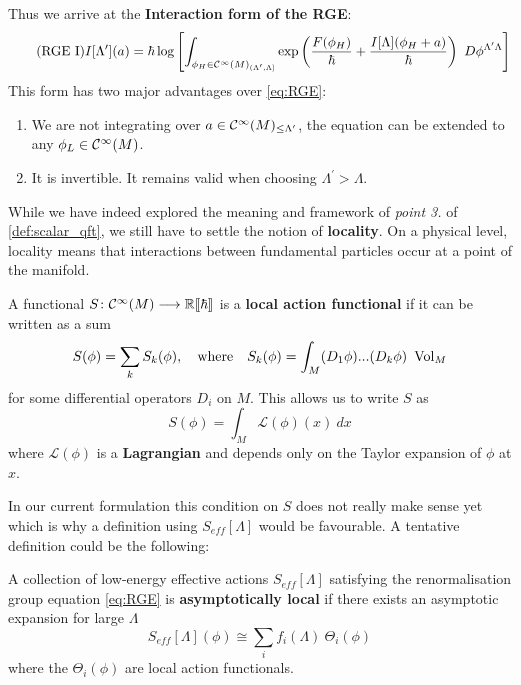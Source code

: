 Thus we arrive at the \textbf{Interaction form of the RGE}:
\begin{align}
\label{eq:RGE_interaction}\tag{RGE I}
  I[\Lambda^\prime](a) = \hbar \log \left[  \int_{\phi_H \in \Ci(M)_{(\Lambda^\prime,\Lambda]}} \exp\left(\frac{F(\phi_H)}{\hbar} + \frac{I[\Lambda](\phi_H + a)}{\hbar} \right) \ D\phi^{\Lambda^\prime \Lambda} \right]
\end{align}
This form has two major advantages over \eqref{eq:RGE}:
\begin{enumerate}
  \item We are not integrating over $a \in \mathcal{C}^{\infty}(M)_{\leq \Lambda^\prime}$, the equation can be extended to any $\phi_L \in \Ci(M)$.

  \item It is invertible. It remains valid when choosing $\Lambda^\prime > \Lambda$.
\end{enumerate}

While we have indeed explored the meaning and framework of \emph{point 3.} of \ref{def:scalar_qft}, we still have to settle the notion of \textbf{locality}. On a physical level, locality means that interactions between fundamental particles occur at a point of the manifold.

\begin{definition}
  A functional $S\colon \mathcal{C}^{\infty}(M) \longrightarrow \mathbb{R} \llbracket \hbar \rrbracket$ is a \textbf{local action functional} if it can be written as a sum
  $$ S(\phi) = \sum_k S_k (\phi), \quad \text{where} \quad S_k(\phi) = \int_M (D_1 \phi) ... (D_k \phi) \ \vol_M$$
  for some differential operators $D_i$ on $M$. This allows us to write $S$ as
  $$ S(\phi) = \int_M \mathcal{L}(\phi)(x) \ dx $$
  where $\mathcal{L}(\phi)$ is a \textbf{Lagrangian} and depends only on the Taylor expansion of $\phi$ at $x$.
\end{definition}

In our current formulation this condition on $S$ does not really make sense yet which is why a definition using $S_{eff}[\Lambda]$ would be favourable. A tentative definition could be the following:

\begin{definition}
  A collection of low-energy effective actions $S_{eff}[\Lambda]$ satisfying the renormalisation group equation \ref{eq:RGE} is \textbf{asymptotically local} if there exists an asymptotic expansion for large $\Lambda$
  $$ S_{eff}[\Lambda] (\phi) \cong \sum_i f_i (\Lambda) \ \Theta_i (\phi) $$
  where the $\Theta_i (\phi)$ are local action functionals.
\end{definition}

